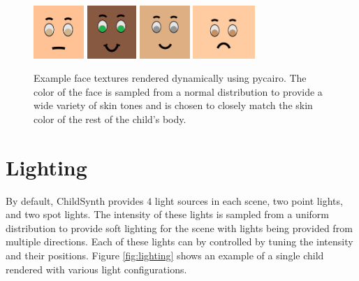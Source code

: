 \documentclass{article}
\begin{document}
\begin{figure}[htbp]
    \centering
    \includegraphics[height=2.0cm]{plots/face.png}
    \includegraphics[height=2.0cm]{plots/face4.png}
    \includegraphics[height=2.0cm]{plots/face2.png}
    \includegraphics[height=2.0cm]{plots/face3.png}
    \caption{Example face textures rendered dynamically using pycairo. The color of the face is sampled from a normal distribution to provide a wide variety of skin tones and is chosen to closely match the skin color of the rest of the child's body.}
    \label{fig:faces}
\end{figure}

\section{Lighting}
By default, ChildSynth provides $4$ light sources in each scene, two point lights, and two spot lights. The intensity of these lights is sampled from a uniform distribution to provide soft lighting for the scene with lights being provided from multiple directions. Each of these lights can by controlled by tuning the intensity and their positions.  Figure \ref{fig:lighting} shows an example of a single child rendered with various light configurations.
\end{document}
